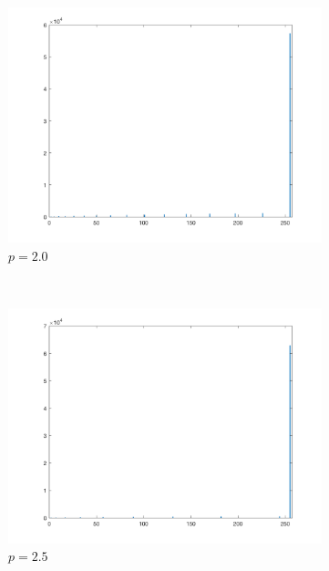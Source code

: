 \documentclass{article}
\begin{document}
\begin{enumerate}[label=(\alph*)]
\begin{figure}[!htb]
        \begin{subfigure}[b]{0.3\textwidth}
            \includegraphics[width=\textwidth]{img/hist_PL20.png}
            \caption{$p = 2.0$}
        \end{subfigure}
        ~
        \begin{subfigure}[b]{0.3\textwidth}
            \includegraphics[width=\textwidth]{img/hist_PL25.png}
            \caption{$p = 2.5$}
        \end{subfigure}
        ~
        \begin{subfigure}[b]{0.3\textwidth}

\end{subfigure}
\end{figure}
\end{enumerate}
\end{document}
